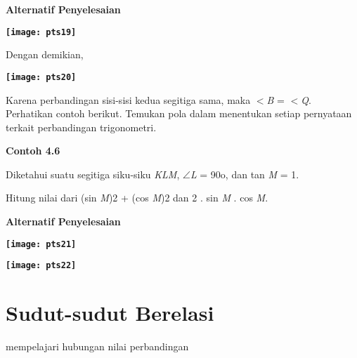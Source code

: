 \documentclass[11pt,fleqn]{book} %
\begin{document}
\begin{myEnumerate}
\begin{itemize}
\noindent 

\noindent \textbf{Alternatif Penyelesaian}

\noindent \textbf{}

\noindent \textbf{\texttt{[image: pts19]}}

\noindent \textbf{}

\noindent Dengan demikian,

\noindent 

\noindent \textbf{\texttt{[image: pts20]}}

\noindent \textbf{}

\noindent Karena perbandingan sisi-sisi kedua segitiga sama, maka $<$\textit{B }= $<$\textit{Q}. Perhatikan contoh berikut. Temukan pola dalam menentukan setiap pernyataan terkait perbandingan trigonometri.

\noindent \textbf{}

\noindent \textbf{Contoh 4.6}

\noindent \textbf{}

\noindent Diketahui suatu segitiga siku-siku \textit{KLM}, $\mathrm{\angle}$\textit{L }= 90o, dan tan \textit{M }= 1.

\noindent 

\noindent Hitung nilai dari (sin \textit{M})2 + (cos \textit{M})2 dan 2 . sin \textit{M }. cos \textit{M}.

\noindent 

\noindent 

\noindent 

\noindent 

\noindent 

\noindent 

\noindent \textbf{Alternatif Penyelesaian}

\noindent \textbf{}

\noindent \textbf{\texttt{[image: pts21]}}

\noindent \textbf{\texttt{[image: pts22]}}

\noindent \textbf{}
\section{Sudut-sudut Berelasi}
\noindent mempelajari hubungan nilai perbandingan


\end{itemize}
\end{myEnumerate}
\end{document}
